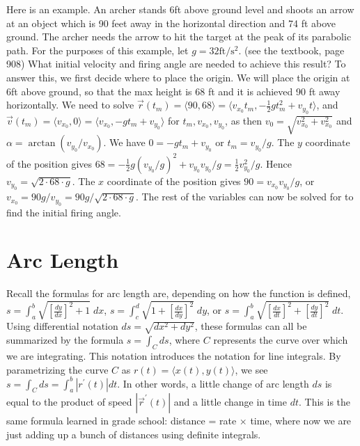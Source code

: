 Here is an example.  An archer stands 6ft above ground level and
shoots an arrow at an object which is 90 feet away in the horizontal
direction and 74 ft above ground. The archer needs the arrow to hit
the target at the peak of its parabolic path. For the purposes of this
example, let $g = 32 \text{ft}/\text{s}^2$. (see the textbook, page
908) What initial velocity and firing angle are needed to achieve this
result? To answer this, we first decide where to place the origin.  We
will place the origin at 6ft above ground, so that the max height is
68 ft and it is achieved 90 ft away horizontally.  We need to solve
$\vec r(t_m)=\langle90,68\rangle = \langle v_{x_0}t_m, -\frac{1}{2}gt_m^2+v_{y_0}t\rangle$,
and $\vec v(t_m)= \langle v_{x_0},0 \rangle=\langle v_{x_0},-gt_m+v_{y_0}\rangle $ for $t_m,
v_{x_0}, v_{y_0}$, as then $v_0=\sqrt{ v_{x_0}^2+ v_{x_0}^2}$ and $\alpha =
\arctan( v_{y_0}/ v_{x_0})$.  We have $ 0 = -gt_m+v_{y_0}$ or $t_m =
v_{y_0}/g$.  The $y$ coordinate of the position gives
$68=-\frac{1}{2}g(v_{y_0}/g)^2+v_{y_0}v_{y_0}/g =
\frac{1}{2}v_{y_0}^2/g$. Hence $v_{y_0} = \sqrt{2\cdot 68\cdot g}$. The $x$
coordinate of the position gives $90 = v_{x_0}v_{y_0}/g$, or $v_{x_0}
= 90g/v_{y_0}=90g/\sqrt{2\cdot 68\cdot g}$. The rest of the variables can now
be solved for to find the initial firing angle.




\section{Arc Length}

Recall the formulas for arc length are, depending on how the function
is defined, $ s=\int_a^b \sqrt{[\frac{dy}{dx}]^2+1}\;dx$, $s=\int_c^d
\sqrt{1+[\frac{dx}{dy}]^2}\;dy$, or $s=\int_a^b
\sqrt{[\frac{dx}{dt}]^2+[\frac{dy}{dt}]^2}\;dt $.  Using differential
notation {$ ds=\sqrt{dx^2+dy^2} $}, these formulas can all be
summarized by the formula $ s=\int_C ds $, where $C$ represents the curve
over which we are integrating. This notation introduces the notation
for line integrals. By parametrizing the curve $C$ as {$ r(t)=\langle
  x(t),y(t)\rangle $}, we see $ s=\int_C ds = \int_a^b |r^\prime(t)| dt $.  In other
words, a little change of arc length {$ ds $} is equal to the product
of speed $|\vec r^\prime(t)|$ and a little change in time $dt$.  This is
the same formula learned in grade school: distance = rate $\times$ time,
where now we are just adding up a bunch of distances using definite
integrals.

